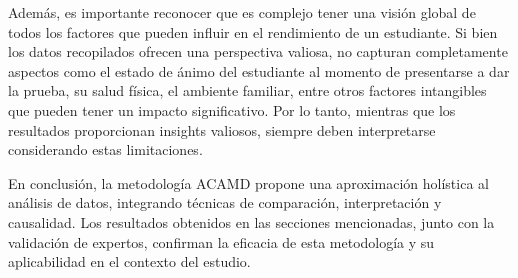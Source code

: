 Además, es importante reconocer que es complejo tener una visión global de todos los factores que pueden influir en el rendimiento de un estudiante. Si bien los datos recopilados ofrecen una perspectiva valiosa, no capturan completamente aspectos como el estado de ánimo del estudiante al momento de presentarse a dar la prueba, su salud física, el ambiente familiar, entre otros factores intangibles que pueden tener un impacto significativo. Por lo tanto, mientras que los resultados proporcionan insights valiosos, siempre deben interpretarse considerando estas limitaciones.

En conclusión, la metodología ACAMD propone una aproximación holística al análisis de datos, integrando técnicas de comparación, interpretación y causalidad. Los resultados obtenidos en las secciones mencionadas, junto con la validación de expertos, confirman la eficacia de esta metodología y su aplicabilidad en el contexto del estudio.
